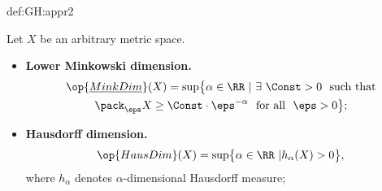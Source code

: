 {\begin{subthm}{def:GH:appr2}
\begin{itemize}
\end{itemize}




 Let $X$ be an arbitrary metric space.
\begin{itemize}
\item \textbf{Lower Minkowski dimension.}
\begin{multline*}
\op{\underline{MinkDim}}(X)=\sup\bigl\{\alpha\in\RR\ |\ \exists\ \Const>0\ \  \text{such that}\\ 
\pack_\eps X\ge\Const\cdot\eps^{-\alpha}\ \ \text{for all}\ \ \eps>0\bigr\};
\end{multline*}
\item \textbf{Hausdorff dimension.}
\[\op{HausDim}(X)=\sup\bigl\{\alpha\in\RR\ | h_\alpha(X)>0\bigr\},\]
 where $h_\alpha$ denotes $\alpha$-dimensional Hausdorff measure;
\end{itemize}





\end{subthm}}

